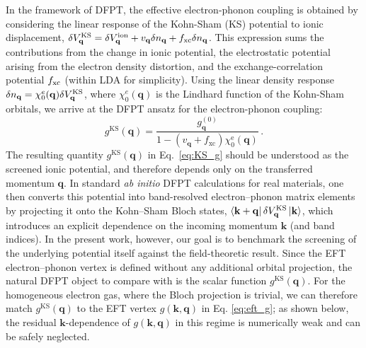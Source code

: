 \documentclass[%
 reprint,
superscriptaddress,
 amsmath,amssymb,
 aps,
prx,
]{revtex4-2}
\newcommand{\bq}{\mathbf{q}}
\newcommand{\bk}{\mathbf{k}}
\newcommand{\txe}{\text{e}}
\newcommand{\txxc}{\text{xc}}
\newcommand{\txKS}{\text{KS}}
\begin{document}
In the framework of DFPT, the effective electron-phonon coupling is obtained by considering the linear response of the Kohn-Sham (KS) potential to ionic displacement, $\delta V^{\rm KS}_{\bq} = \delta V^{\rm ion}_{\bq} +v_{\bq} \delta n_{\bq}+f_{\rm xc} \delta n_{\bq}$. This expression sums the contributions from the change in ionic potential, the electrostatic potential arising from the electron density distortion, and the exchange-correlation potential $f_{\rm xc}$ (within LDA for simplicity). Using the linear density response $\delta n_{\bq}= \chi_0^e(\bq) \delta V^{\rm KS}_{\bq}$, where $\chi_0^e(\bq)$ is the Lindhard function of the Kohn-Sham orbitals, we arrive at the DFPT ansatz for the electron-phonon coupling:
\begin{equation}
\label{eq:KS_g}
g^{\txKS}(\bq) = \frac{g^{(0)}_{\bq}}{1-(v_{\bq}+f_{\txxc})\chi_0^\txe(\bq)} \, .
\end{equation}
The resulting quantity $g^{\txKS}(\bq)$ in Eq.~\eqref{eq:KS_g} should be understood as the screened ionic potential, and therefore depends only on the transferred momentum $\bq$. In standard \emph{ab initio} DFPT calculations for real materials, one then converts this potential into band-resolved electron–phonon matrix elements by projecting it onto the Kohn–Sham Bloch states, $\bra{\bk+\bq} \delta V^{\rm KS}_{\bq} \ket{\bk}$, which introduces an explicit dependence on the incoming momentum $\bk$ (and band indices). In the present work, however, our goal is to benchmark the screening of the underlying potential itself against the field-theoretic result. Since the EFT electron–phonon vertex is defined without any additional orbital projection, the natural DFPT object to compare with is the scalar function $g^{\txKS}(\bq)$. For the homogeneous electron gas, where the Bloch projection is trivial, we can therefore match $g^{\txKS}(\bq)$ to the EFT vertex $g(\bk,\bq)$ in Eq. \ref{eq:eft_g}; as shown below, the residual $\bk$-dependence of $g(\bk,\bq)$ in this regime is numerically weak and can be safely neglected.
\end{document}
